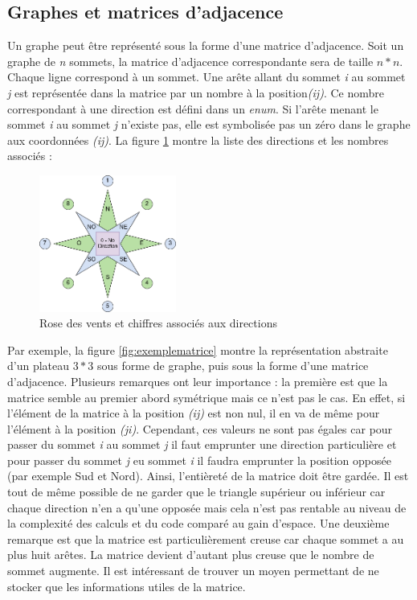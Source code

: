 \documentclass[a4paper]{article}
\begin{document}
\subsection{Graphes et matrices d'adjacence}

Un graphe peut être représenté sous la forme d'une matrice d'adjacence. Soit un graphe de \emph{n} sommets, la matrice d'adjacence correspondante sera de taille $n * n$. Chaque ligne correspond à un sommet. Une arête allant du sommet \emph{i} au sommet \emph{j} est représentée dans la matrice par un nombre à la position\emph{(ij)}. Ce nombre correspondant à une direction est défini dans un \emph{enum}. Si l'arête menant le sommet \emph{i} au sommet \emph{j} n'existe pas, elle est symbolisée pas un zéro dans le graphe aux coordonnées \emph{(ij)}. La figure \ref{fig:rose} montre la liste des directions et les nombres associés :

\begin{figure}[h!]
    \centering
    \includegraphics[width=0.4\textwidth]{Rose.png}
    \caption{Rose des vents et chiffres associés aux directions}
    \label{fig:rose}
\end{figure}

Par exemple, la figure \ref{fig:exemplematrice} montre la représentation abstraite d'un plateau $3 * 3$ sous forme de graphe, puis sous la forme d'une matrice d'adjacence. Plusieurs remarques ont leur importance : la première est que la matrice semble au premier abord symétrique mais ce n'est pas le cas. En effet, si l'élément de la matrice à la position \emph{(ij)} est non nul, il en va de même pour l'élément à la position \emph{(ji)}. Cependant, ces valeurs ne sont pas égales car pour passer du sommet \emph{i} au sommet \emph{j} il faut emprunter une direction particulière et pour passer du sommet \emph{j} eu sommet \emph{i} il faudra emprunter la position opposée (par exemple Sud et Nord). Ainsi, l'entièreté de la matrice doit être gardée. Il est tout de même possible de ne garder que le triangle supérieur ou inférieur car chaque direction n'en a qu'une opposée mais cela n'est pas rentable au niveau de la complexité des calculs et du code comparé au gain d'espace. Une deuxième remarque est que la matrice est particulièrement creuse car chaque sommet a au plus huit arêtes. La matrice devient d'autant plus creuse que le nombre de sommet augmente. Il est intéressant de trouver un moyen permettant de ne stocker que les informations utiles de la matrice. 
\end{document}
